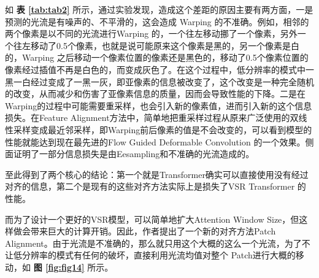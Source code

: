 如 \textbf{表 \ref{tab:tab2}} 所示，通过实验发现，造成这个差距的原因主要有两方面，一是预测的光流是有噪声的、不平滑的，这会造成 Warping 的不准确。例如，相邻的两个像素是以不同的光流进行Warping 的，一个往左移动挪了一个像素，另外一个往左移动了0.5个像素，也就是说可能原来这个像素是黑的，另一个像素是白的，Warping 之后移动一个像素位置的像素还是黑色的，移动了0.5个像素位置的像素经过插值不再是白色的，而变成灰色了。在这个过程中，低分辨率的模式中一黑一白经过变成了一黑一灰，即亚像素的信息被改变了，这个改变是一种完全随机的改变，从而减少和伤害了亚像素信息的质量，因而会导致性能的下降。二是在Warping的过程中可能需要重采样，也会引入新的像素值，进而引入新的这个信息损失。在Feature Alignment方法中，简单地把重采样过程从原来广泛使用的双线性采样变成最近邻采样，即Warping前后像素的值是不会改变的，可以看到模型的性能就能达到现在最先进的Flow Guided Deformable Convolution 的一个效果。侧面证明了一部分信息损失是由Eesampling和不准确的光流造成的。

\begin{table}[!ht]
\caption{The Ablation study of Patch Align- ment. We study the effect of different re- sampling methods (BI and NN) and differ- ent alignment positions (image space and feature space).}
    \centering
    \hfill
    \label{tab:tab3}
\end{table}

至此得到了两个核心的结论：第一个就是Transformer确实可以直接使用没有经过对齐的信息，第二个是现有的这些对齐方法实际上是损失了VSR Transformer 的性能。

而为了设计一个更好的VSR模型，可以简单地扩大Attention Window Size，但这样做会带来巨大的计算开销。因此，作者提出了一个新的对齐方法Patch Alignment。由于光流是不准确的，那么就只用这个大概的这么一个光流，为了不让低分辨率的模式有任何的破坏，直接利用光流均值对整个 Patch进行大概的移动，如 \textbf{图 \ref{fig:fig14}} 所示。

